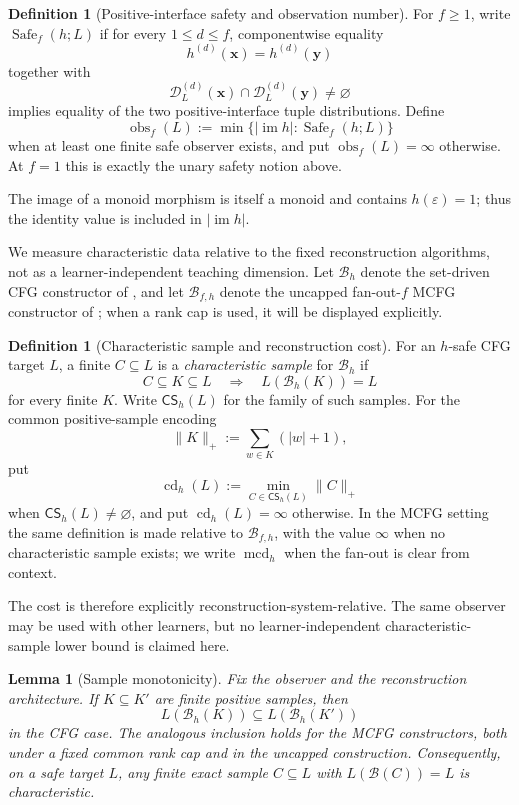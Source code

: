 \documentclass[11pt]{article}
\newtheorem{lemma}[theorem]{Lemma}
\theoremstyle{definition}
\newtheorem{definition}[theorem]{Definition}
\theoremstyle{remark}
\newcommand{\eps}{\varepsilon}
\newcommand{\D}{\mathcal D}
\newcommand{\im}{\operatorname{im}}
\newcommand{\obs}{\operatorname{obs}}
\newcommand{\cd}{\operatorname{cd}}
\newcommand{\mcd}{\operatorname{mcd}}
\newcommand{\CS}{\mathsf{CS}}
\newcommand{\Safe}{\operatorname{Safe}}
\begin{document}
\begin{definition}[Positive-interface safety and observation number]
For \(f\ge1\), write \(\Safe_f(h;L)\) if for every \(1\le d\le f\),
componentwise equality
\[
 h^{(d)}(\mathbf x)=h^{(d)}(\mathbf y)
\]
together with
\[
 \D_L^{(d)}(\mathbf x)\cap
 \D_L^{(d)}(\mathbf y)\ne\varnothing
\]
implies equality of the two positive-interface tuple distributions.
Define
\[
 \obs_f(L):=
 \min\{|\im h|:\Safe_f(h;L)\}
\]
when at least one finite safe observer exists, and put
\(\obs_f(L)=\infty\) otherwise.  At \(f=1\) this is exactly the unary
safety notion above.
\end{definition}

The image of a monoid morphism is itself a monoid and contains
\(h(\eps)=1\); thus the identity value is included in \(|\im h|\).

We measure characteristic data relative to the fixed reconstruction
algorithms, not as a learner-independent teaching dimension.  Let
\(\mathcal B_h\) denote the set-driven CFG constructor of
\cite{KuriyamaCFG}, and let \(\mathcal B_{f,h}\) denote the uncapped
fan-out-\(f\) MCFG constructor of \cite{KuriyamaMCFG}; when a rank cap is used,
it will be displayed explicitly.

\begin{definition}[Characteristic sample and reconstruction cost]
For an \(h\)-safe CFG target \(L\), a finite \(C\subseteq L\) is a
\emph{characteristic sample} for \(\mathcal B_h\) if
\[
 C\subseteq K\subseteq L
 \quad\Longrightarrow\quad
 L(\mathcal B_h(K))=L
\]
for every finite \(K\).  Write \(\CS_h(L)\) for the family of such samples.
For the common positive-sample encoding
\[
 \|K\|_+:=\sum_{w\in K}(|w|+1),
\]
put
\[
 \cd_h(L):=\min_{C\in\CS_h(L)}\|C\|_+
\]
when \(\CS_h(L)\ne\varnothing\), and put \(\cd_h(L)=\infty\) otherwise.
In the MCFG setting the same definition is made relative to
\(\mathcal B_{f,h}\), with the value \(\infty\) when no characteristic
sample exists; we write \(\mcd_h\) when the fan-out is clear from context.
\end{definition}

The cost is therefore explicitly reconstruction-system-relative.  The same
observer may be used with other learners, but no learner-independent
characteristic-sample lower bound is claimed here.

\begin{lemma}[Sample monotonicity]
\label{lem:sample-monotonicity}
Fix the observer and the reconstruction architecture.  If
\(K\subseteq K'\) are finite positive samples, then
\[
 L(\mathcal B_h(K))\subseteq L(\mathcal B_h(K'))
\]
in the CFG case.  The analogous inclusion holds for the MCFG constructors,
both under a fixed common rank cap and in the uncapped construction.
Consequently, on a safe target \(L\), any finite exact sample
\(C\subseteq L\) with \(L(\mathcal B(C))=L\) is characteristic.
\end{lemma}
\end{document}
